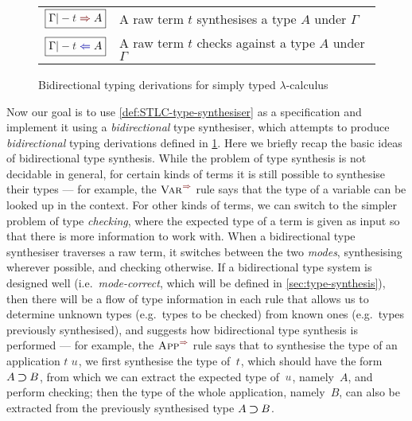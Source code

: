 \begin{figure}
  \small
  \bgroup
  \renewcommand{\arraystretch}{1.5}
  \begin{tabular}{ r l }
    $\boxed{\Gamma |- \isTerm{t} \syn A}$ & A raw term $t$ synthesises a type $A$ under $\Gamma$ \\
    $\boxed{\Gamma |- \isTerm{t} \chk A}$ &A raw term $t$ checks against a type $A$ under $\Gamma$
  \end{tabular}
  \egroup
  \centering
  \caption{Bidirectional typing derivations for simply typed $\lambda$-calculus}
  \label{fig:STLC-bidirectional-typing-derivations}
\end{figure}

Now our goal is to use \cref{def:STLC-type-synthesiser} as a specification and implement it using a \emph{bidirectional} type synthesiser, which attempts to produce \emph{bidirectional} typing derivations defined in \cref{fig:STLC-bidirectional-typing-derivations}.
Here we briefly recap the basic ideas of bidirectional type synthesis.
While the problem of type synthesis is not decidable in general, for certain kinds of terms it is still possible to synthesise their types --- for example, the $\SynRule{Var}$ rule says that the type of a variable can be looked up in the context.
For other kinds of terms, we can switch to the simpler problem of type \emph{checking}, where the expected type of a term is given as input so that there is more information to work with.
When a bidirectional type synthesiser traverses a raw term, it switches between the two \emph{modes}, synthesising wherever possible, and checking otherwise.
If a bidirectional type system is designed well (i.e.~\emph{mode-correct}, which will be defined in \cref{sec:type-synthesis}), then there will be a flow of type information in each rule that allows us to determine unknown types (e.g.~types to be checked) from known ones (e.g.~types previously synthesised), and suggests how bidirectional type synthesis is performed --- for example, the $\SynRule{App}$ rule says that to synthesise the type of an application $\isTerm{t\;u}$, we first synthesise the type of~$\isTerm{t}$, which should have the form $A \mathbin{\bm{\supset}} B$, from which we can extract the expected type of~$\isTerm{u}$, namely~$A$, and perform checking; then the type of the whole application, namely~$B$, can also be extracted from the previously synthesised type $A \mathbin{\bm{\supset}} B$.

